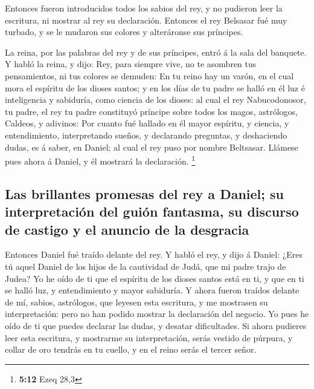  Entonces fueron introducidos todos los sabios del rey, y no
pudieron leer la escritura, ni mostrar al rey su declaración.
 Entonces el rey Belsasar fué muy turbado, y se le mudaron
sus colores y alteráronse sus príncipes.

 La reina, por las palabras del rey y de sus príncipes,
entró á la sala del banquete. Y habló la reina, y dijo: Rey, para
siempre vive, no te asombren tus pensamientos, ni tus colores se
demuden:  En tu reino hay un varón, en el cual mora el
espíritu de los dioses santos; y en los días de tu padre se halló en él
luz é inteligencia y sabiduría, como ciencia de los dioses: al cual el
rey Nabucodonosor, tu padre, el rey tu padre constituyó príncipe sobre
todos los magos, astrólogos, Caldeos, y adivinos:  Por
cuanto fué hallado en él mayor espíritu, y ciencia, y entendimiento,
interpretando sueños, y declarando preguntas, y deshaciendo dudas, es á
saber, en Daniel; al cual el rey puso por nombre Beltsasar. Llámese pues
ahora á Daniel, y él mostrará la declaración. \footnote{\textbf{5:12}
  Ezeq 28,3}

\hypertarget{las-brillantes-promesas-del-rey-a-daniel-su-interpretaciuxf3n-del-guiuxf3n-fantasma-su-discurso-de-castigo-y-el-anuncio-de-la-desgracia}{%
\subsection{Las brillantes promesas del rey a Daniel; su interpretación
del guión fantasma, su discurso de castigo y el anuncio de la
desgracia}\label{las-brillantes-promesas-del-rey-a-daniel-su-interpretaciuxf3n-del-guiuxf3n-fantasma-su-discurso-de-castigo-y-el-anuncio-de-la-desgracia}}

 Entonces Daniel fué traído delante del rey. Y habló el
rey, y dijo á Daniel: ¿Eres tú aquel Daniel de los hijos de la
cautividad de Judá, que mi padre trajo de Judea?  Yo he
oído de ti que el espíritu de los dioses santos está en ti, y que en ti
se halló luz, y entendimiento y mayor sabiduría.  Y ahora
fueron traídos delante de mí, sabios, astrólogos, que leyesen esta
escritura, y me mostrasen su interpretación: pero no han podido mostrar
la declaración del negocio.  Yo pues he oído de ti que
puedes declarar las dudas, y desatar dificultades. Si ahora pudieres
leer esta escritura, y mostrarme su interpretación, serás vestido de
púrpura, y collar de oro tendrás en tu cuello, y en el reino serás el
tercer señor.

